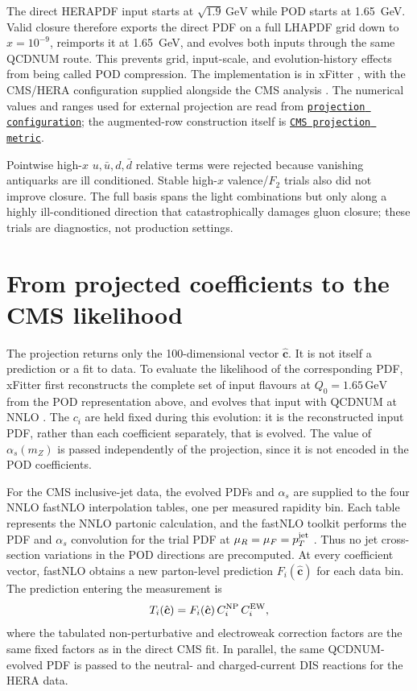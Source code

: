 \documentclass[11pt]{article}
\newcommand{\incljetscode}[2]{\href{https://github.com/HephyAnalysisSW/InclJets/blob/main/#1}{\texttt{#2}}}
\begin{document}
The direct HERAPDF input starts at $\sqrt{1.9}\,\mathrm{GeV}$ while POD
starts at 1.65~GeV. Valid closure therefore exports the direct PDF on a full
LHAPDF grid down to $x=10^{-9}$, reimports it at 1.65~GeV, and evolves both
inputs through the same QCDNUM route. This prevents grid, input-scale, and
evolution-history effects from being called POD compression. The
implementation is in xFitter \cite{XFitter}, with the CMS/HERA configuration
supplied alongside the CMS analysis \cite{CMS,HERA}. The numerical values and
ranges used for external projection are read from
\incljetscode{fits/SMP-22-014/figure2/likelihood_scans/scan_config.yaml}{projection configuration};
the augmented-row construction itself is
\incljetscode{fits/SMP-22-014/figure2/likelihood_scans/projection_metrics.py}{CMS projection metric}.

Pointwise high-$x$ $u,\bar u,d,\bar d$ relative terms were rejected because vanishing antiquarks are ill conditioned. Stable high-$x$ valence/$F_2$ trials also did not improve closure. The full basis spans the light combinations but only along a highly ill-conditioned direction that catastrophically damages gluon closure; these trials are diagnostics, not production settings.

\section{From projected coefficients to the CMS likelihood}
The projection returns only the 100-dimensional vector $\hat{\boldsymbol c}$.
It is not itself a prediction or a fit to data.  To evaluate the likelihood of
the corresponding PDF, xFitter first reconstructs the complete set of input
flavours at $Q_0=1.65\,\mathrm{GeV}$ from the POD representation above, and evolves that input
with QCDNUM at NNLO \cite{XFitter,QCDNUM}.  The $c_i$ are held fixed during
this evolution: it is the reconstructed input PDF, rather than each
coefficient separately, that is evolved.  The value of $\alpha_s(m_Z)$ is
passed independently of the projection, since it is not encoded in the POD
coefficients.

For the CMS inclusive-jet data, the evolved PDFs and $\alpha_s$ are supplied
to the four NNLO fastNLO interpolation tables, one per measured rapidity bin.
Each table represents the NNLO partonic calculation, and the fastNLO toolkit
performs the PDF and $\alpha_s$ convolution for the trial PDF at
$\mu_R=\mu_F=p_T^{\rm jet}$ \cite{fastNLO}.  Thus no jet cross-section
variations in the POD directions are precomputed.  At every coefficient
vector, fastNLO obtains a new parton-level prediction $F_i(\hat{\boldsymbol
c})$ for each data bin.  The prediction entering the measurement is
\begin{equation}
  T_i(\hat{\boldsymbol c}) = F_i(\hat{\boldsymbol c})\,
       C^{\rm NP}_i\,C^{\rm EW}_i,
\end{equation}
where the tabulated non-perturbative and electroweak correction factors are
the same fixed factors as in the direct CMS fit.  In parallel, the same
QCDNUM-evolved PDF is passed to the neutral- and charged-current DIS
reactions for the HERA data.
\end{document}
